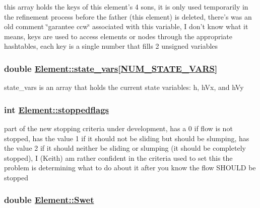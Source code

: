 this array holds the keys of this element's 4 sons, it is only used temporarily in the refinement process before the father (this element) is deleted, there's was an old comment \char`\"{}garantee ccw\char`\"{} associated with this variable, I don't know what it means, keys are used to access elements or nodes through the appropriate hashtables, each key is a single number that fills 2 unsigned variables 

\hypertarget{classElement_r28}{
\subsubsection[state\_\-vars]{\setlength{\rightskip}{0pt plus 5cm}double \hyperlink{classElement_r28}{Element::state\_\-vars}\mbox{[}\hyperlink{constant_8h_a45}{NUM\_\-STATE\_\-VARS}\mbox{]}}}
\label{classElement_r28}


state\_\-vars is an array that holds the current state variables: h, h\-Vx, and h\-Vy 

\hypertarget{classElement_r43}{
\subsubsection[stoppedflags]{\setlength{\rightskip}{0pt plus 5cm}int \hyperlink{classElement_r43}{Element::stoppedflags}}}
\label{classElement_r43}


part of the new stopping criteria under development, has a 0 if flow is not stopped, has the value 1 if it should not be sliding but should be slumping, has the value 2 if it should neither be sliding or slumping (it should be completely stopped), I (Keith) am rather confident in the criteria used to set this the problem is determining what to do about it after you know the flow SHOULD be stopped 

\hypertarget{classElement_r53}{
\subsubsection[Swet]{\setlength{\rightskip}{0pt plus 5cm}double \hyperlink{classElement_r53}{Element::Swet}}}
\label{classElement_r53}


